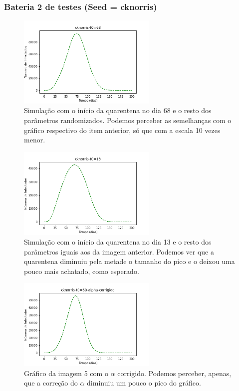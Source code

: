 \documentclass[11pt]{article}
\begin{document}
\subsubsection{Bateria 2 de testes (Seed = cknorris)}
\label{sec:org5d2b7ac}
\begin{figure}[htbp]
\centering
\includegraphics[width=250px]{images/cknorris-t0=68.png}
\caption{Simulação com o início da quarentena no dia 68 e o resto dos parâmetros randomizados. Podemos perceber as semelhanças com o gráfico respectivo do item anterior, só que com a escala 10 vezes menor.}
\end{figure}

\begin{figure}[htbp]
\centering
\includegraphics[width=250px]{images/cknorris-t0=13.png}
\caption{Simulação com o início da quarentena no dia 13 e o resto dos parâmetros iguais aos da imagem anterior. Podemos ver que a quarentena diminuiu pela metade o tamanho do pico e o deixou uma pouco mais achatado, como esperado.}
\end{figure}

\begin{figure}[htbp]
\centering
\includegraphics[width=250px]{images/cknorris-t0=68-alpha-corrigido.png}
\caption{Gráfico da imagem 5 com o \(\alpha\) corrigido. Podemos perceber, apenas, que a correção do \(\alpha\) diminuiu um pouco o pico do gráfico.}
\end{figure}
\end{document}
